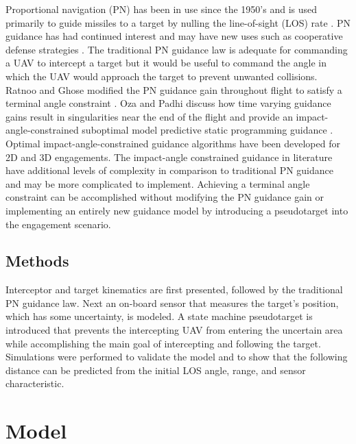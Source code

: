 \documentclass[conference]{IEEEtran}
\begin{document}
Proportional navigation (PN) has been in use since the 1950's \cite{zarchan} and is used primarily to guide missiles to a target by nulling the line-of-sight (LOS) rate \cite{shneydor1998missile,yanushevsky2007modern}. PN guidance has had continued interest and may have new uses such as cooperative defense strategies \cite{isaac}. The traditional PN guidance law is adequate for commanding a UAV to intercept a target but it would be useful to command the angle in which the UAV would approach the target to prevent unwanted collisions. Ratnoo and Ghose modified the PN guidance gain throughout flight to satisfy a terminal angle constraint \cite{ratnoo2009satisfying}. Oza and Padhi discuss how time varying guidance gains result in singularities near the end of the flight and provide an impact-angle-constrained suboptimal model predictive static programming guidance \cite{oza2012impact}. Optimal impact-angle-constrained guidance algorithms have been developed for 2D \cite{park2013optimal} and 3D \cite{kumar2014three} engagements. The impact-angle constrained guidance in literature have additional levels of complexity in comparison to traditional PN guidance and may be more complicated to implement. Achieving a terminal angle constraint can be accomplished without modifying the PN guidance gain or implementing an entirely new guidance model by introducing a pseudotarget into the engagement scenario.



\subsection{Methods}
Interceptor and target kinematics are first presented, followed by the traditional PN guidance law. Next an on-board sensor that measures the target's position, which has some uncertainty, is modeled. A state machine pseudotarget is introduced that prevents the intercepting UAV from entering the uncertain area while accomplishing the main goal of intercepting and following the target. Simulations were performed to validate the model and to show that the following distance can be predicted from the initial LOS angle, range, and sensor characteristic.

\section{Model}
\end{document}
